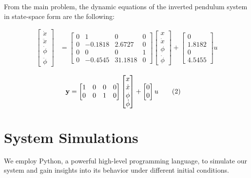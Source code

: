 \documentclass[11pt,twocolumn,twoside,lineno]{pnas-new}
\begin{document}
From the main problem, the dynamic equations of the inverted pendulum system in state-space form are the following:

\begin{align}
\begin{bmatrix}
  \dot{x} \\ \ddot{x} \\ \dot{\phi} \\ \ddot{\phi}
\end{bmatrix} &=
\begin{bmatrix}
  0 & 1 & 0 & 0 \\
  0 & -0.1818 & 2.6727 & 0 \\
  0 & 0 & 0 & 1 \\
  0 & -0.4545 & 31.1818 & 0
\end{bmatrix}
\begin{bmatrix}
  x \\ \dot{x} \\ \phi \\ \dot{\phi}
\end{bmatrix} +
\begin{bmatrix}
  0 \\ 1.8182 \\ 0 \\ 4.5455
\end{bmatrix}u \tag{1}
\end{align}

\begin{align}
{\bf y} &= \begin{bmatrix}
  1 & 0 & 0 & 0 \\
  0 & 0 & 1 & 0
\end{bmatrix}
\begin{bmatrix}
  x \\ \dot{x} \\ \phi \\ \dot{\phi}
\end{bmatrix} +
\begin{bmatrix}
  0 \\ 0
\end{bmatrix}u \tag{2}
\end{align}

\newpage

\section{System Simulations}
We employ Python, a powerful high-level programming language, to simulate our system and gain insights into its behavior under different initial conditions.
\end{document}
